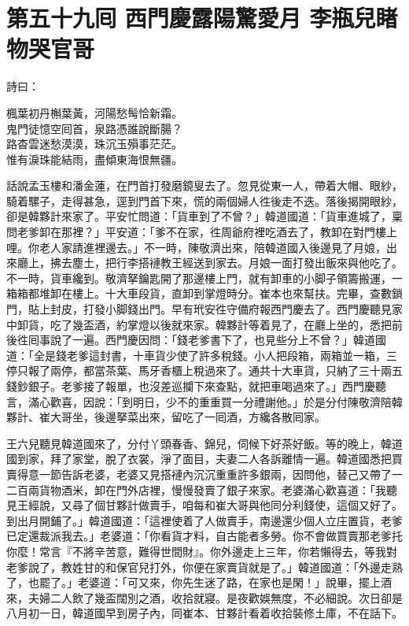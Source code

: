 
\chapter*{第五十九囘 西門慶露陽驚愛月 李瓶兒睹物哭官哥}


詩曰：

\begin{myquote} 
楓葉初丹槲葉黃，河陽愁髩恰新霜。\\鬼門徒憶空囘首，泉路憑誰說斷腸？\\路杳雲迷愁漠漠，珠沉玉殞事茫茫。\\惟有淚珠能結雨，盡傾東海恨無疆。
\end{myquote} 

話說孟玉樓和潘金蓮，在門首打發磨鏡叟去了。忽見從東一人，帶着大帽、眼紗，騎着騾子，走得甚急，逕到門首下來，慌的兩個婦人徃後走不迭。落後揭開眼紗，卻是韓夥計來家了。平安忙問道：「貨車到了不曾？」韓道國道：「貨車進城了，稟問老爹卸在那裡？」平安道：「爹不在家，徃周爺府裡吃酒去了，教卸在對門樓上哩。你老人家請進裡邊去。」不一時，陳敬濟出來，陪韓道國入後邊見了月娘，出來廳上，拂去塵土，把行李搭褳教王經送到家去。月娘一面打發出飯來與他吃了。不一時，貨車纔到。敬濟拏鑰匙開了那邊樓上門，就有卸車的小脚子領籌搬運，一箱箱都堆卸在樓上。十大車段貨，直卸到掌燈時分。崔本也來幫扶。完畢，查數鎖門，貼上封皮，打發小脚錢出門。早有玳安徃守備府報西門慶去了。西門慶聽見家中卸貨，吃了幾盃酒，約掌燈以後就來家。韓夥計等着見了，在廳上坐的，悉把前後徃囘事說了一遍。西門慶因問：「錢老爹書下了，也見些分上不曾？」韓道國道：「全是錢老爹這封書，十車貨少使了許多稅錢。小人把段箱，兩箱並一箱，三停只報了兩停，都當茶葉、馬牙香櫃上稅過來了。通共十大車貨，只納了三十兩五錢鈔銀子。老爹接了報單，也沒差巡攔下來查點，就把車喝過來了。」西門慶聽言，滿心歡喜，{}因說：「到明日，少不的重重買一分禮謝他。」於是分付陳敬濟陪韓夥計、崔大哥坐，後邊拏菜出來，留吃了一囘酒，方纔各散囘家。

王六兒聽見韓道國來了，分付丫頭春香、錦兒，伺候下好茶好飯。等的晚上，韓道國到家，拜了家堂，脫了衣裳，淨了面目，夫妻二人各訴離情一遍。韓道國悉把買賣得意一節告訴老婆，老婆又見搭褳內沉沉重重許多銀兩，因問他，替己又帶了一二百兩貨物酒米，卸在門外店裡，慢慢發賣了銀子來家。老婆滿心歡喜道：「我聽見王經說，又尋了個甘夥計做賣手，咱每和崔大哥與他同分利錢使，這個又好了。到出月開鋪了。」韓道國道：「這裡使着了人做賣手，南邊還少個人立庄置貨，老爹已定還裁派我去。」老婆道：「你看貨才料，自古能者多勞。你不會做買賣那老爹托你麼！常言『不將辛苦意，難得世間財』。你外邊走上三年，你若懶得去，等我對老爹說了，教姓甘的和保官兒打外，你便在家賣貨就是了。」韓道國道：「外邊走熟了，也罷了。」老婆道：「可又來，你先生迷了路，在家也是閑！」說畢，擺上酒來，夫婦二人飲了幾盃闊別之酒，收拾就寢。是夜歡娛無度，不必細說。次日卻是八月初一日，韓道國早到房子內，同崔本、甘夥計看着收拾裝修土庫，不在話下。

